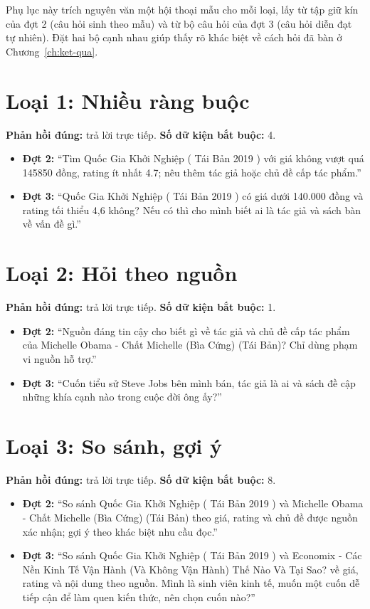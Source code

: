 Phụ lục này trích nguyên văn một hội thoại mẫu cho mỗi loại, lấy từ tập giữ kín của đợt 2 (câu hỏi sinh theo mẫu) và từ bộ câu hỏi của đợt 3 (câu hỏi diễn đạt tự nhiên). Đặt hai bộ cạnh nhau giúp thấy rõ khác biệt về cách hỏi đã bàn ở Chương~\ref{ch:ket-qua}.

\section*{Loại 1: Nhiều ràng buộc}

\textbf{Phản hồi đúng:} trả lời trực tiếp. \textbf{Số dữ kiện bắt buộc:} 4.

\begin{itemize}
    \item \textbf{Đợt 2:} ``Tìm Quốc Gia Khởi Nghiệp ( Tái Bản 2019 ) với giá không vượt quá 145850 đồng, rating ít nhất 4.7; nêu thêm tác giả hoặc chủ đề cấp tác phẩm.''
    \item \textbf{Đợt 3:} ``Quốc Gia Khởi Nghiệp ( Tái Bản 2019 ) có giá dưới 140.000 đồng và rating tối thiểu 4,6 không? Nếu có thì cho mình biết ai là tác giả và sách bàn về vấn đề gì.''
\end{itemize}

\section*{Loại 2: Hỏi theo nguồn}

\textbf{Phản hồi đúng:} trả lời trực tiếp. \textbf{Số dữ kiện bắt buộc:} 1.

\begin{itemize}
    \item \textbf{Đợt 2:} ``Nguồn đáng tin cậy cho biết gì về tác giả và chủ đề cấp tác phẩm của Michelle Obama - Chất Michelle (Bìa Cứng) (Tái Bản)? Chỉ dùng phạm vi nguồn hỗ trợ.''
    \item \textbf{Đợt 3:} ``Cuốn tiểu sử Steve Jobs bên mình bán, tác giả là ai và sách đề cập những khía cạnh nào trong cuộc đời ông ấy?''
\end{itemize}

\section*{Loại 3: So sánh, gợi ý}

\textbf{Phản hồi đúng:} trả lời trực tiếp. \textbf{Số dữ kiện bắt buộc:} 8.

\begin{itemize}
    \item \textbf{Đợt 2:} ``So sánh Quốc Gia Khởi Nghiệp ( Tái Bản 2019 ) và Michelle Obama - Chất Michelle (Bìa Cứng) (Tái Bản) theo giá, rating và chủ đề được nguồn xác nhận; gợi ý theo khác biệt nhu cầu đọc.''
    \item \textbf{Đợt 3:} ``So sánh Quốc Gia Khởi Nghiệp ( Tái Bản 2019 ) và Economix - Các Nền Kinh Tế Vận Hành (Và Không Vận Hành) Thế Nào Và Tại Sao? về giá, rating và nội dung theo nguồn. Mình là sinh viên kinh tế, muốn một cuốn dễ tiếp cận để làm quen kiến thức, nên chọn cuốn nào?''
\end{itemize}

